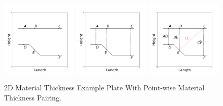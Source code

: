 \documentclass[%
]{USN-MSc}
\begin{document}
\begin{figure}[H]
  \centering
  \includegraphics[width=0.325\textwidth]{fig/Cross1.png}
  \includegraphics[width=0.325\textwidth]{fig/Cross2.png}
  \includegraphics[width=0.325\textwidth]{fig/Cross3.png}
  \caption{2D Material Thickness Example Plate With Point-wise Material Thickness Pairing.}
  \label{fig:Metal Plate Cross-section}
\end{figure}
\end{document}
